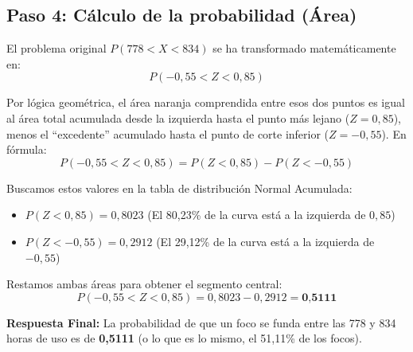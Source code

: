 \documentclass[11pt, a4paper]{article}
\begin{document}
\begin{center}
\end{center}

\vspace{0.3cm}

\subsection*{Paso 4: Cálculo de la probabilidad (Área)}
El problema original $P(778 < X < 834)$ se ha transformado matemáticamente en:
\[ P(-0,55 < Z < 0,85) \]

Por lógica geométrica, el área naranja comprendida entre esos dos puntos es igual al área total acumulada desde la izquierda hasta el punto más lejano ($Z=0,85$), menos el ``excedente'' acumulado hasta el punto de corte inferior ($Z=-0,55$). En fórmula:
\[ P(-0,55 < Z < 0,85) = P(Z < 0,85) - P(Z < -0,55) \]

Buscamos estos valores en la tabla de distribución Normal Acumulada:
\begin{itemize}
    \item $P(Z < 0,85) = 0,8023$ \quad (El 80,23\% de la curva está a la izquierda de $0,85$)
    \item $P(Z < -0,55) = 0,2912$ \quad (El 29,12\% de la curva está a la izquierda de $-0,55$)
\end{itemize}

Restamos ambas áreas para obtener el segmento central:
\[ P(-0,55 < Z < 0,85) = 0,8023 - 0,2912 = \textbf{0,5111} \]

\vspace{0.3cm}
\noindent\colorbox{yellow!30}{\parbox{\textwidth}{
\textbf{Respuesta Final:} La probabilidad de que un foco se funda entre las 778 y 834 horas de uso es de \textbf{0,5111} (o lo que es lo mismo, el 51,11\% de los focos).
}}
\end{document}
